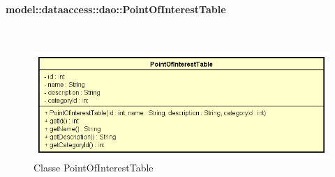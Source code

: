 \documentclass[../DefinizioneDiProdotto.tex]{subfiles}
\begin{document}
\paragraph{model::dataaccess::dao::PointOfInterestTable}
\
\begin{figure}[H]
	\centering
	\includegraphics[width=\maxwidth]{img/PointOfInterestTable.png}
	\caption{Classe PointOfInterestTable}\label{fig:model::dataaccess::dao::PointOfInterestTable} 
\end{figure}
\end{document}
